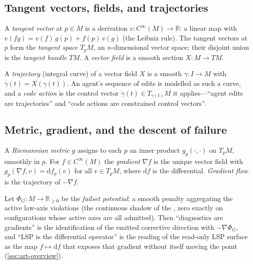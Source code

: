 \subsection{Tangent vectors, fields, and trajectories}
\label{sec:geo-tangent}

\begin{definition}
A \emph{tangent vector} at $p\in M$ is a derivation $v\colon C^\infty(M)\to\mathbb
R$: a linear map with $v(fg)=v(f)\,g(p)+f(p)\,v(g)$ (the Leibniz rule). The
tangent vectors at $p$ form the \emph{tangent space} $T_pM$, an $n$-dimensional
vector space; their disjoint union is the \emph{tangent bundle} $TM$. A
\emph{vector field} is a smooth section $X\colon M\to TM$.
\end{definition}

\begin{definition}[Trajectory]
A \emph{trajectory} (integral curve) of a vector field $X$ is a smooth
$\gamma\colon I\to M$ with $\dot\gamma(t)=X(\gamma(t))$. An agent's sequence of
edits is modelled as such a curve, and a \emph{code action} is the control vector
$\dot\gamma(t)\in T_{\gamma(t)}M$ it applies---``agent edits are trajectories''
and ``code actions are constrained control vectors''.
\end{definition}

\subsection{Metric, gradient, and the descent of failure}
\label{sec:geo-metric}

\begin{definition}
\label{def:geo-metric}
A \emph{Riemannian metric} $g$ assigns to each $p$ an inner product
$g_p(\cdot,\cdot)$ on $T_pM$, smoothly in $p$. For $f\in C^\infty(M)$ the
\emph{gradient} $\nabla f$ is the unique vector field with
$g_p(\nabla f, v)=\mathrm df_p(v)$ for all $v\in T_pM$, where $\mathrm df$ is the
differential. \emph{Gradient flow} is the trajectory of $-\nabla f$.
\end{definition}

Let $\Phi_G\colon M\to\mathbb R_{\ge 0}$ be the \emph{failset potential}: a smooth
penalty aggregating the active law-axis violations (the continuous shadow of the
, zero exactly on configurations whose active axes are all admitted). Then
``diagnostics are gradients'' is the identification of the emitted corrective
direction with $-\nabla\Phi_G$, and ``LSP is the differential operator'' is the
reading of the read-only LSP surface as the map $f\mapsto\mathrm df$ that exposes
that gradient without itself moving the point (\cref{sec:art-overview}).

